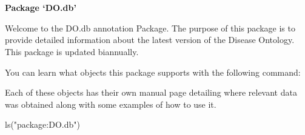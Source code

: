 \documentclass[a4paper]{book}
\begin{document}
\chapter*{}
\begin{center}
{\textbf{\huge Package `DO.db'}}
\par\bigskip{\large \today}
\end{center}
\begin{description}
\raggedright{}
\item[Title]
\item[Description]
\item[Version]
\item[Author]
\item[Maintainer]\AsIs{}
\item[Depends]
\item[Imports]
\item[License]
\item[biocViews]
\end{description}
%
\begin{Description}\relax

Welcome to the DO.db annotation Package.  The purpose of this package
is to provide detailed information about the latest version of the
Disease Ontology.  This package is updated biannually.

You can learn what objects this package supports with the following command:


Each of these objects has their own manual page detailing where
relevant data was obtained along with some examples of how to use it.
\end{Description}
%
\begin{Examples}
\begin{ExampleCode}
  ls("package:DO.db")
\end{ExampleCode}
\end{Examples}
\end{document}
